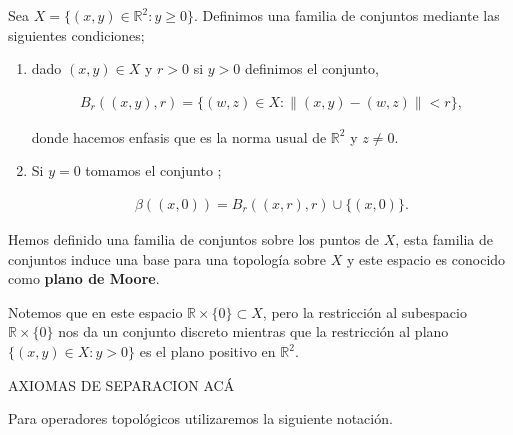 \begin{ej}
Sea $X= \{(x,y) \in \mathbb{R}^2: y \geq 0 \}$. Definimos una familia de conjuntos mediante las siguientes condiciones; 

\begin{enumerate}
	\item dado $(x,y) \in X$ y $r>0$ si $y > 0$ definimos el conjunto,

	\begin{align*}
	B_r((x,y),r)=\{(w,z) \in X : \| (x,y)-(w,z) \| < r \},	
	\end{align*}

donde hacemos enfasis que es la norma usual de $\mathbb{R}^2$ y $z \neq 0$. 

	\item Si $y=0$ tomamos el conjunto ;

	\begin{align*}
	\beta((x,0))=B_r((x,r),r) \cup \{(x,0)\}.
	\end{align*}
\end{enumerate}

Hemos definido una familia de conjuntos sobre los puntos de $X$, esta familia de conjuntos induce una base para una topología sobre $X$ y este espacio es conocido como \textbf{plano de Moore}.

Notemos que en este espacio $\mathbb{R} \times \{0\} \subset X$, pero la restricción al subespacio $\mathbb{R} \times \{0\}$ nos da un conjunto discreto mientras que la restricción al plano $\{(x,y)\in X :y > 0 \}$ es el plano positivo en $\mathbb{R}^2.$
\end{ej}

AXIOMAS DE SEPARACION ACÁ

Para operadores topológicos utilizaremos la siguiente notación. 

